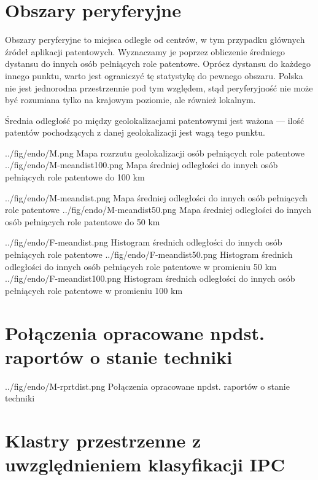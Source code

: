     \newpage\section
  {Obszary peryferyjne}

Obszary peryferyjne to miejsca odległe od centrów, w tym przypadku
głównych źródeł aplikacji patentowych. Wyznaczamy je poprzez obliczenie
średniego dystansu do innych osób pełniących role patentowe.
Oprócz dystansu do każdego innego punktu, warto jest ograniczyć
tę statystykę do pewnego obszaru. Polska nie jest jednorodna przestrzennie 
pod tym względem, stąd peryferyjność nie może być rozumiana tylko 
na krajowym poziomie, ale również lokalnym.

\begin{uwaga}
Średnia odległość po między geolokalizacjami patentowymi jest ważona ---
ilość patentów pochodzących z danej geolokalizacji jest wagą tego punktu.
\end{uwaga}

  \figsides
{../fig/endo/M.png}
{ Mapa rozrzutu geolokalizacji osób pełniących role patentowe }
{../fig/endo/M-meandist100.png}
{ Mapa średniej odległości do innych osób pełniących role patentowe do 100 km }

\figsides
{../fig/endo/M-meandist.png}
{ Mapa średniej odległości do innych osób pełniących role patentowe }
{../fig/endo/M-meandist50.png}
{ Mapa średniej odległości do innych osób pełniących role patentowe do 50 km }

\figsidesTri
{../fig/endo/F-meandist.png}
{ Histogram średnich odległości do innych osób pełniących role patentowe }
{../fig/endo/F-meandist50.png}
{ Histogram średnich odległości do innych osób pełniących role patentowe w promieniu 50 km }
{../fig/endo/F-meandist100.png}
{ Histogram średnich odległości do innych osób pełniących role patentowe w promieniu 100 km }




    \newpage\section
  {Połączenia opracowane npdst. raportów o stanie techniki}

{../fig/endo/M-rprtdist.png}
{ Połączenia opracowane npdst. raportów o stanie techniki }




    \newpage\section
  {Klastry przestrzenne z uwzględnieniem klasyfikacji \ac{IPC}}

